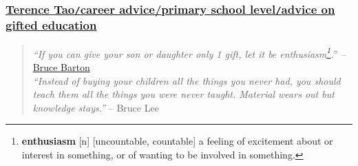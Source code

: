 \documentclass{article}
\numberwithin{equation}{section}
\begin{document}
\subsubsection{\href{https://terrytao.wordpress.com/career-advice/advice-on-gifted-education/}{Terence Tao\texttt{/}career advice{/}primary school level\texttt{/}advice on gifted education}}
\begin{quotation}
	\textit{``If you can give your son or daughter only 1 gift, let it be enthusiasm\footnote{\textbf{enthusiasm} [n] [uncountable, countable] a feeling of excitement about or interest in something, or of wanting to be involved in something.}.}'' -- \href{http://en.wikipedia.org/wiki/Bruce_Fairchild_Barton}{Bruce Barton}\\
	
	\textit{``Instead of buying your children all the things you never had, you should teach them all the things you were never taught. Material wears out but knowledge stays.''} -- Bruce Lee
\end{quotation}
\end{document}
